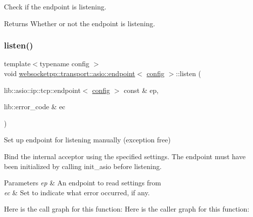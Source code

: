 Check if the endpoint is listening. 

\begin{DoxyReturn}{Returns}
Whether or not the endpoint is listening. 
\end{DoxyReturn}
\mbox{\label{classwebsocketpp_1_1transport_1_1asio_1_1endpoint_ac36c2b22a7c2550663792472a728f615}} 
\subsubsection{\texorpdfstring{listen()}{listen()}\hspace{0.1cm}{\footnotesize\ttfamily [1/8]}}
{\footnotesize\ttfamily template$<$typename config $>$ \\
void \mbox{\hyperlink{classwebsocketpp_1_1transport_1_1asio_1_1endpoint}{websocketpp\+::transport\+::asio\+::endpoint}}$<$ \mbox{\hyperlink{classconfig}{config}} $>$\+::listen (\begin{DoxyParamCaption}\item[{lib\+::asio\+::ip\+::tcp\+::endpoint$<$ \mbox{\hyperlink{classconfig}{config}} $>$ const \&}]{ep,  }\item[{lib\+::error\+\_\+code \&}]{ec }\end{DoxyParamCaption})\hspace{0.3cm}{\ttfamily [inline]}}



Set up endpoint for listening manually (exception free) 

Bind the internal acceptor using the specified settings. The endpoint must have been initialized by calling init\+\_\+asio before listening.


\begin{DoxyParams}{Parameters}
{\em ep} & An endpoint to read settings from \\
\hline
{\em ec} & Set to indicate what error occurred, if any. \\
\hline
\end{DoxyParams}
Here is the call graph for this function\+:
Here is the caller graph for this function\+:
\mbox{\label{classwebsocketpp_1_1transport_1_1asio_1_1endpoint_ab3d7708b939531c5c803e3b148a9b009}} 
